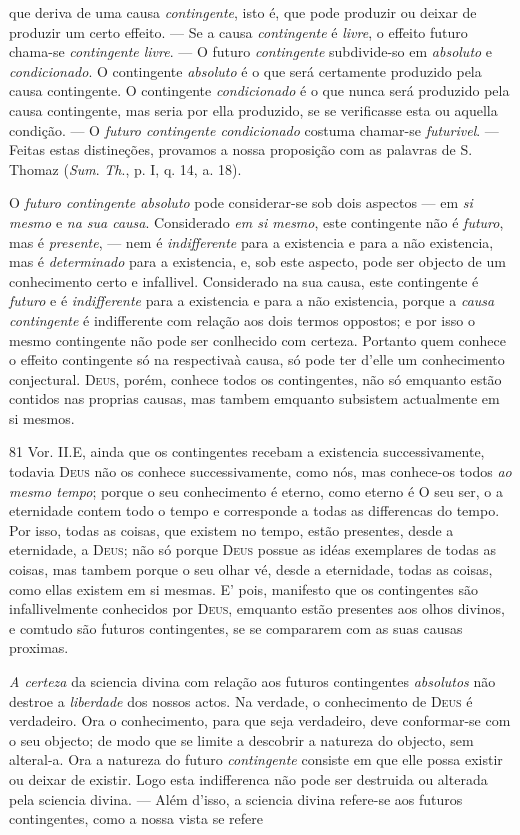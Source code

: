 que deriva de uma causa \emph{contingente}, isto é, que pode produzir ou deixar de produzir um certo effeito. --- Se a causa \emph{contingente} é \emph{livre}, o effeito futuro chama-se \emph{contingente livre}. --- O futuro \emph{contingente} subdivide-so em \emph{absoluto} e \emph{condicionado}. O contingente \emph{absoluto} é o que será certamente produzido pela causa contingente. O contingente \emph{condicionado} é o que nunca será produzido pela causa contingente, mas seria por ella produzido, se se verificasse esta ou aquella condição. --- O \emph{futuro contingente condicionado} costuma chamar-se \emph{futurivel}. --- Feitas estas distineções, provamos a nossa proposição com as palavras de S. Thomaz (\emph{Sum}. \emph{Th}., p. I, q. 14, a. 18).\par O \emph{futuro contingente absoluto} pode considerar-se sob dois aspectos --- em \emph{si mesmo} e \emph{na sua causa}. Considerado \emph{em si mesmo}, este contingente não é \emph{futuro}, mas é \emph{presente}, --- nem é \emph{indifferente} para a existencia e para a não existencia, mas é \emph{determinado} para a existencia, e, sob este aspecto, pode ser objecto de um conhecimento certo e infallivel. Considerado na sua causa, este contingente é \emph{futuro} e é \emph{indifferente} para a existencia e para a não existencia, porque a \emph{causa contingente} é indifferente com relação aos dois termos oppostos; e por isso o mesmo contingente não pode ser conlhecido com certeza. Portanto quem conhece o effeito contingente só na respectivaà causa, só pode ter d'elle um conhecimento conjectural. \textsc{Deus}, porém, conhece todos os contingentes, não só emquanto estão contidos nas proprias causas, mas tambem emquanto subsistem actualmente em si mesmos.\par 81 Vor. II.E, ainda que os contingentes recebam a existencia successivamente, todavia \textsc{Deus} não os conhece successivamente, como nós, mas conhece-os todos \emph{ao mesmo tempo}; porque o seu conhecimento é eterno, como eterno é O seu ser, o a eternidade contem todo o tempo e corresponde a todas as differencas do tempo. Por isso, todas as coisas, que existem no tempo, estão presentes, desde a eternidade, a \textsc{Deus}; não só porque \textsc{Deus} possue as idéas exemplares de todas as coisas, mas tambem porque o seu olhar vé, desde a eternidade, todas as coisas, como ellas existem em si mesmas. E' pois, manifesto que os contingentes são infallivelmente conhecidos por \textsc{Deus}, emquanto estão presentes aos olhos divinos, e comtudo são futuros contingentes, se se compararem com as suas causas proximas.\par \emph{A certeza} da sciencia divina com relação aos futuros contingentes \emph{absolutos} não destroe a \emph{liberdade} dos nossos actos. Na verdade, o conhecimento de \textsc{Deus} é verdadeiro. Ora o conhecimento, para que seja verdadeiro, deve conformar-se com o seu objecto; de modo que se limite a descobrir a natureza do objecto, sem alteral-a. Ora a natureza do futuro \emph{contingente} consiste em que elle possa existir ou deixar de existir. Logo esta indifferenca não pode ser destruida ou alterada pela sciencia divina. --- Além d'isso, a sciencia divina refere-se aos futuros contingentes, como a nossa vista se refere 